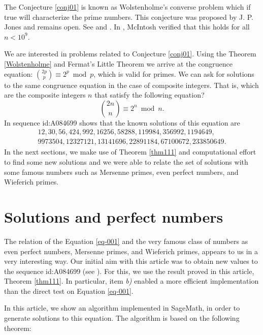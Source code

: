 \documentclass[11pt,a4paper]{article}
\begin{document}
The Conjecture \ref{conj01} is known as Wolstenholme's converse problem which if true will characterize the prime numbers. This conjecture was proposed by J. P. Jones and remains open. See \cite[p. 23]{Ribenboim} and \cite[p. 84]{Guy}. In \cite{McIntsh}, McIntosh verified that this holds for all $n<10^9.$

We are interested in problems related to Conjecture \ref{conj01}. Using the Theorem \ref{Wolstenholme} and Fermat's Little Theorem we arrive at the congruence equation: $\binom{2p}{p}\equiv 2^p \bmod {p} $, which is valid for primes. We can ask for solutions to the same congruence equation in the case of composite integers. That is, which are the composite integers $n$ that satisfy the following equation?
\begin{equation*}%
\binom{2n}{n}\equiv 2^n \bmod n.
\end{equation*}
In \cite{oeis} sequence id:A084699 shows that the known solutions of this equation are 
\begin{align*}
12, 30, 56, 424, 992, 16256, 58288, 119984,
356992, 1194649, \quad \\
 9973504, 12327121, 13141696,
22891184, 67100672, 233850649.
\end{align*}
In the next sections, we make use of Theorem \ref{thm111} and computational effort to find some new solutions and we were able to relate the set of solutions with some famous numbers such as Mersenne primes, even perfect numbers, and Wieferich primes.



\section{Solutions and perfect numbers}
The relation of the Equation \eqref{eq-001} and the very famous class of numbers as even perfect numbers, Mersenne primes, and Wieferich primes, appears to us in a very interesting way. Our initial aim with this article was to obtain new values to the sequence id:A084699 (see \cite{oeis}). For this, we use the result proved in this article, Theorem \ref{thm111}. In particular, item \textit{ b)} enabled a more efficient implementation than the direct test on Equation \eqref{eq-001}.





In this article, we show an algorithm implemented in SageMath, in order to generate solutions to this equation. 
The algorithm is based on the following theorem:
\end{document}
